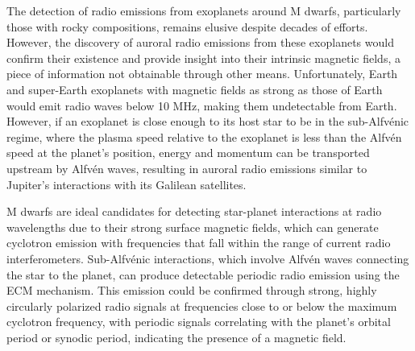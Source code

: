 \documentclass{article}
\begin{document}
The detection of radio emissions from exoplanets around M dwarfs, particularly those with rocky compositions, remains elusive despite decades of efforts. However, the discovery of auroral radio emissions from these exoplanets would confirm their existence and provide insight into their intrinsic magnetic fields, a piece of information not obtainable through other means. Unfortunately, Earth and super-Earth exoplanets with magnetic fields as strong as those of Earth would emit radio waves below 10 MHz, making them undetectable from Earth. However, if an exoplanet is close enough to its host star to be in the sub-Alfvénic regime, where the plasma speed relative to the exoplanet is less than the Alfvén speed at the planet's position, energy and momentum can be transported upstream by Alfvén waves, resulting in auroral radio emissions similar to Jupiter's interactions with its Galilean satellites.

M dwarfs are ideal candidates for detecting star-planet interactions at radio wavelengths due to their strong surface magnetic fields, which can generate cyclotron emission with frequencies that fall within the range of current radio interferometers. Sub-Alfvénic interactions, which involve Alfvén waves connecting the star to the planet, can produce detectable periodic radio emission using the ECM mechanism. This emission could be confirmed through strong, highly circularly polarized radio signals at frequencies close to or below the maximum cyclotron frequency, with periodic signals correlating with the planet's orbital period or synodic period, indicating the presence of a magnetic field.
\end{document}
